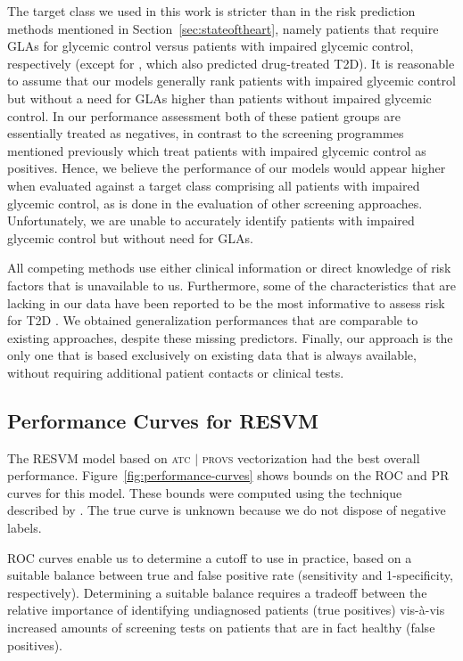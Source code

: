 \documentclass[twoside,11pt]{article}
\begin{document}
The target class we used in this work is stricter than in the risk prediction methods mentioned in Section~\ref{sec:stateoftheart}, namely patients that require GLAs for glycemic control versus patients with impaired glycemic control, respectively (except for \citet{lindstrom2003diabetes}, which also predicted drug-treated T2D). It is reasonable to assume that our models generally rank patients with impaired glycemic control but without a need for GLAs higher than patients without impaired glycemic control. In our performance assessment both of these patient groups are essentially treated as negatives, in contrast to the screening programmes mentioned previously which treat patients with impaired glycemic control as positives. Hence, we believe the performance of our models would appear higher when evaluated against a target class comprising all patients with impaired glycemic control, as is done in the evaluation of other screening approaches. Unfortunately, we are unable to accurately identify patients with impaired glycemic control but without need for GLAs.

All competing methods use either clinical information or direct knowledge of risk factors that is unavailable to us. Furthermore, some of the characteristics that are lacking in our data have been reported to be the most informative to assess risk for T2D \citep{lindstrom2003diabetes,stern2002identification, mcneely2003comparison}. We obtained generalization performances that are comparable to existing approaches, despite these missing predictors. Finally, our approach is the only one that is based exclusively on existing data that is always available, without requiring additional patient contacts or clinical tests.


\subsection{Performance Curves for RESVM} \label{resvmroc}
The RESVM model based on \textsc{atc $|$ provs} vectorization had the best overall performance. Figure~\ref{fig:performance-curves} shows bounds on the ROC and PR curves for this model. These bounds were computed using the technique described by \citet{claesen2015icml}. The true curve is unknown because we do not dispose of negative labels.

ROC curves enable us to determine a cutoff to use in practice, based on a suitable balance between true and false positive rate (sensitivity and 1-specificity, respectively). Determining a suitable balance requires a tradeoff between the relative importance of identifying undiagnosed patients (true positives) vis-\`a-vis increased amounts of screening tests on patients that are in fact healthy (false positives).
\end{document}
